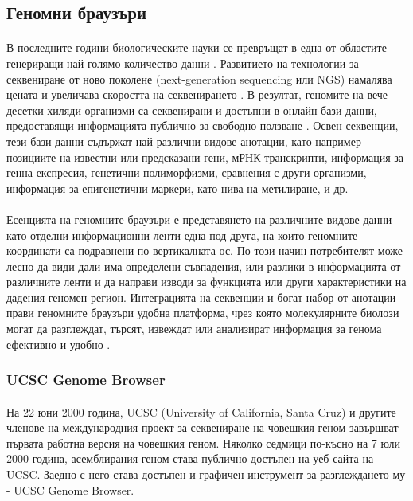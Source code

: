 \documentclass[pdftex,cyrillic,14pt,a4page,twoside,openright]{extreport}
\begin{document}
\subsection{Геномни браузъри}
\paragraph{}
В последните години биологическите науки се превръщат в една от областите генериращи най-голямо количество данни \cite{Stephens2015}. Развитието на технологии за секвениране от ново поколене (next-generation sequencing или NGS) намалява цената и увеличава скоростта на секвенирането \cite{schuster2008}. В резултат, геномите на вече десетки хиляди организми са секвенирани и достъпни в онлайн бази данни, предоставящи информацията публично за свободно ползване \cite{mukherjee2020}. Освен секвенции, тези бази данни съдържат най-различни видове анотации, като например позициите на известни или предсказани гени, мРНК транскрипти, информация за генна експресия, генетични полиморфизми, сравнения с други организми, информация за епигенетични маркери, като нива на метилиране, и др.

\paragraph{}
Есенцията на геномните браузъри е представянето на различните видове данни като отделни информационни ленти една под друга, на които геномните координати са подравнени по вертикалната ос. По този начин потребителят може лесно да види дали има определени съвпадения, или разлики в информацията от различните ленти и да направи изводи за функцията или други характеристики на дадения геномен регион. Интеграцията на секвенции и богат набор от анотации прави геномните браузъри удобна платформа, чрез която молекулярните биолози могат да разглеждат, търсят, извеждат или анализират информация за генома ефективно и удобно \cite{wang2013brief}.

\subsubsection{UCSC Genome Browser}
\paragraph{}
На 22 юни 2000 година, UCSC (University of California, Santa Cruz) и другите членове на международния проект за секвениране на човешкия геном завършват първата работна версия на човешкия геном. Няколко седмици по-късно на 7 юли 2000 година, асемблирания геном става публично достъпен на уеб сайта на UCSC. Заедно с него става достъпен и графичен инструмент за разглеждането му - UCSC Genome Browser.
\end{document}
